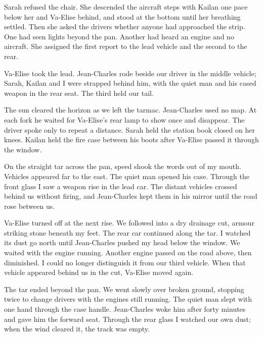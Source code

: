 Sarah refused the chair. She descended the aircraft steps with Kailan one pace below her and Va-Elise behind, and stood at the bottom until her breathing settled. Then she asked the drivers whether anyone had approached the strip. One had seen lights beyond the pan. Another had heard an engine and no aircraft. She assigned the first report to the lead vehicle and the second to the rear.\par

Va-Elise took the lead. Jean-Charles rode beside our driver in the middle vehicle; Sarah, Kailan and I were strapped behind him, with the quiet man and his cased weapon in the rear seat. The third held our tail.\par

The sun cleared the horizon as we left the tarmac. Jean-Charles used no map. At each fork he waited for Va-Elise's rear lamp to show once and disappear. The driver spoke only to repeat a distance. Sarah held the station book closed on her knees. Kailan held the fire case between his boots after Va-Elise passed it through the window.\par

On the straight tar across the pan, speed shook the words out of my mouth. Vehicles appeared far to the east. The quiet man opened his case. Through the front glass I saw a weapon rise in the lead car. The distant vehicles crossed behind us without firing, and Jean-Charles kept them in his mirror until the road rose between us.\par

Va-Elise turned off at the next rise. We followed into a dry drainage cut, armour striking stone beneath my feet. The rear car continued along the tar. I watched its dust go north until Jean-Charles pushed my head below the window. We waited with the engine running. Another engine passed on the road above, then diminished. I could no longer distinguish it from our third vehicle. When that vehicle appeared behind us in the cut, Va-Elise moved again.\par

The tar ended beyond the pan. We went slowly over broken ground, stopping twice to change drivers with the engines still running. The quiet man slept with one hand through the case handle. Jean-Charles woke him after forty minutes and gave him the forward seat. Through the rear glass I watched our own dust; when the wind cleared it, the track was empty.\par

\ornament

